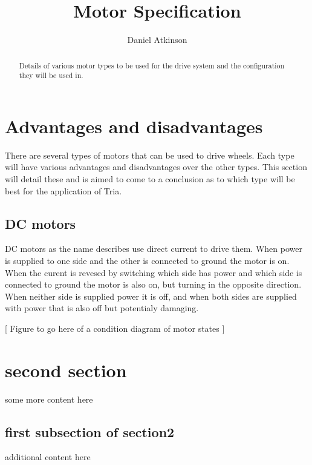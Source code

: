 \documentclass{article}
\begin{document}
\title{Motor Specification}

\author{Daniel Atkinson}

\maketitle

\begin{abstract}

Details of various motor types to be used for the drive system and the configuration they will be used in.

\end{abstract}


\section{Advantages and disadvantages}
There are several types of motors that can be used to drive wheels.  Each type will have various advantages and disadvantages over the other types.  This section will detail these and is aimed to come to a conclusion as to which type will be best for the application of Tria.

\subsection{DC motors}
DC motors as the name describes use direct current to drive them.  When power is supplied to one side and the other is connected to ground the motor is on.  When the curent is revesed by switching which side has power and which side is connected to ground the motor is also on, but turning in the opposite direction.  When neither side is supplied power it is off, and when both sides are supplied with power that is also off but potentialy damaging.

[ Figure to go here of a condition diagram of motor states ]


\section{second section}
some more content here
\subsection{first subsection of section2}
additional content here



\end{document}
